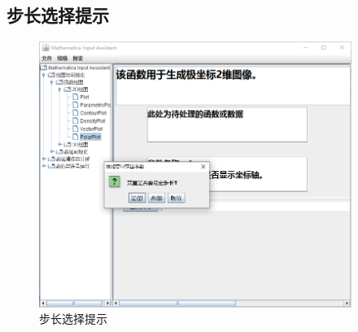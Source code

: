 \documentclass[hyperref, UTF8
,bookmarksnumbered=true, oneside]{ctexbook}
\begin{document}
		\subsection{步长选择提示} %
		\begin{figure}[!h]
           	\centering
           	\includegraphics[width=4in]{23.png}
           	\caption{步长选择提示}    
           	\label{pic:MathObject}
        \end{figure}
		
\end{document}
